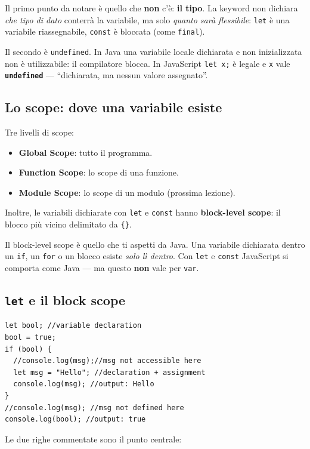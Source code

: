 \documentclass[10pt,a4paper]{article}
\begin{document}
Il primo punto da notare è quello che \textbf{non} c'è: \textbf{il tipo}. La keyword non dichiara \emph{che tipo di dato} conterrà la variabile, ma solo \emph{quanto sarà flessibile}: \texttt{let} è una variabile riassegnabile, \texttt{const} è bloccata (come \texttt{final}).

Il secondo è \texttt{undefined}. In Java una variabile locale dichiarata e non inizializzata non è utilizzabile: il compilatore blocca. In JavaScript \texttt{let x;} è legale e \texttt{x} vale \textbf{\texttt{undefined}} --- ``dichiarata, ma nessun valore assegnato''.

\subsection{Lo scope: dove una variabile esiste}

Tre livelli di scope:

\begin{itemize}
  \item \textbf{Global Scope}: tutto il programma.
  \item \textbf{Function Scope}: lo scope di una funzione.
  \item \textbf{Module Scope}: lo scope di un modulo (prossima lezione).
\end{itemize}

Inoltre, le variabili dichiarate con \texttt{let} e \texttt{const} hanno \textbf{block-level scope}: il blocco più vicino delimitato da \texttt{\{\}}.

Il block-level scope è quello che ti aspetti da Java. Una variabile dichiarata dentro un \texttt{if}, un \texttt{for} o un blocco esiste \emph{solo lì dentro}. Con \texttt{let} e \texttt{const} JavaScript si comporta come Java --- ma questo \textbf{non} vale per \texttt{var}.

\subsection{\texttt{let} e il block scope}

\begin{lstlisting}[style=js]
let bool; //variable declaration
bool = true;
if (bool) {
  //console.log(msg);//msg not accessible here
  let msg = "Hello"; //declaration + assignment
  console.log(msg); //output: Hello
}
//console.log(msg); //msg not defined here
console.log(bool); //output: true
\end{lstlisting}

Le due righe commentate sono il punto centrale:
\end{document}

